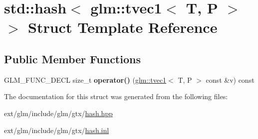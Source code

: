 \hypertarget{structstd_1_1hash_3_01glm_1_1tvec1_3_01_t_00_01_p_01_4_01_4}{\section{std\-:\-:hash$<$ glm\-:\-:tvec1$<$ T, P $>$ $>$ Struct Template Reference}
\label{structstd_1_1hash_3_01glm_1_1tvec1_3_01_t_00_01_p_01_4_01_4}
}
\subsection*{Public Member Functions}
\begin{DoxyCompactItemize}
\item 
\hypertarget{structstd_1_1hash_3_01glm_1_1tvec1_3_01_t_00_01_p_01_4_01_4_a924f5f08ab9d938f9c7c8b820ff56c45}{G\-L\-M\-\_\-\-F\-U\-N\-C\-\_\-\-D\-E\-C\-L size\-\_\-t {\bfseries operator()} (\hyperlink{structglm_1_1tvec1}{glm\-::tvec1}$<$ T, P $>$ const \&v) const }\label{structstd_1_1hash_3_01glm_1_1tvec1_3_01_t_00_01_p_01_4_01_4_a924f5f08ab9d938f9c7c8b820ff56c45}

\end{DoxyCompactItemize}


The documentation for this struct was generated from the following files\-:\begin{DoxyCompactItemize}
\item 
ext/glm/include/glm/gtx/\hyperlink{hash_8hpp}{hash.\-hpp}\item 
ext/glm/include/glm/gtx/\hyperlink{hash_8inl}{hash.\-inl}\end{DoxyCompactItemize}
